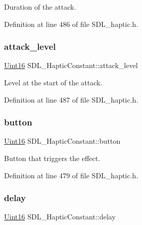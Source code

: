 Duration of the attack. 

Definition at line 486 of file S\+D\+L\+\_\+haptic.\+h.

\mbox{\label{struct_s_d_l___haptic_constant_a0928a37f3fab0e5b7daffc7a1d65744c}} 
\subsubsection{\texorpdfstring{attack\_level}{attack\_level}}
{\footnotesize\ttfamily \mbox{\hyperlink{_s_d_l__stdinc_8h_a31fcc0a076c9068668173ee26d33e42b}{Uint16}} S\+D\+L\+\_\+\+Haptic\+Constant\+::attack\+\_\+level}

Level at the start of the attack. 

Definition at line 487 of file S\+D\+L\+\_\+haptic.\+h.

\mbox{\label{struct_s_d_l___haptic_constant_aa65321f1b002adaab6e629d5bed556e9}} 
\subsubsection{\texorpdfstring{button}{button}}
{\footnotesize\ttfamily \mbox{\hyperlink{_s_d_l__stdinc_8h_a31fcc0a076c9068668173ee26d33e42b}{Uint16}} S\+D\+L\+\_\+\+Haptic\+Constant\+::button}

Button that triggers the effect. 

Definition at line 479 of file S\+D\+L\+\_\+haptic.\+h.

\mbox{\label{struct_s_d_l___haptic_constant_a16a751009893f5412201e3ce91146b25}} 
\subsubsection{\texorpdfstring{delay}{delay}}
{\footnotesize\ttfamily \mbox{\hyperlink{_s_d_l__stdinc_8h_a31fcc0a076c9068668173ee26d33e42b}{Uint16}} S\+D\+L\+\_\+\+Haptic\+Constant\+::delay}

